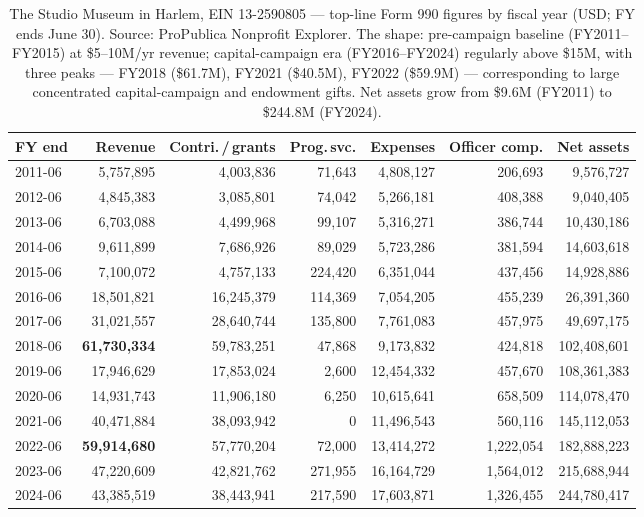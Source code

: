 \documentclass[10pt,letterpaper,twocolumn]{article}
\begin{document}
\begin{table}[t]
\footnotesize
\centering
\setlength{\tabcolsep}{4pt}
\begin{tabularx}{\textwidth}{Xrrrrrr}
\toprule
\textbf{FY end} & \textbf{Revenue} & \textbf{Contri.\,/\,grants} & \textbf{Prog.\,svc.} & \textbf{Expenses} & \textbf{Officer comp.} & \textbf{Net assets} \\
\midrule
2011-06 & 5,757,895 & 4,003,836 & 71,643 & 4,808,127 & 206,693 & 9,576,727 \\
2012-06 & 4,845,383 & 3,085,801 & 74,042 & 5,266,181 & 408,388 & 9,040,405 \\
2013-06 & 6,703,088 & 4,499,968 & 99,107 & 5,316,271 & 386,744 & 10,430,186 \\
2014-06 & 9,611,899 & 7,686,926 & 89,029 & 5,723,286 & 381,594 & 14,603,618 \\
2015-06 & 7,100,072 & 4,757,133 & 224,420 & 6,351,044 & 437,456 & 14,928,886 \\
2016-06 & 18,501,821 & 16,245,379 & 114,369 & 7,054,205 & 455,239 & 26,391,360 \\
2017-06 & 31,021,557 & 28,640,744 & 135,800 & 7,761,083 & 457,975 & 49,697,175 \\
2018-06 & \textbf{61,730,334} & 59,783,251 & 47,868 & 9,173,832 & 424,818 & 102,408,601 \\
2019-06 & 17,946,629 & 17,853,024 & 2,600 & 12,454,332 & 457,670 & 108,361,383 \\
2020-06 & 14,931,743 & 11,906,180 & 6,250 & 10,615,641 & 658,509 & 114,078,470 \\
2021-06 & 40,471,884 & 38,093,942 & 0 & 11,496,543 & 560,116 & 145,112,053 \\
2022-06 & \textbf{59,914,680} & 57,770,204 & 72,000 & 13,414,272 & 1,222,054 & 182,888,223 \\
2023-06 & 47,220,609 & 42,821,762 & 271,955 & 16,164,729 & 1,564,012 & 215,688,944 \\
2024-06 & 43,385,519 & 38,443,941 & 217,590 & 17,603,871 & 1,326,455 & 244,780,417 \\
\bottomrule
\end{tabularx}
\caption{The Studio Museum in Harlem, EIN 13-2590805 --- top-line Form 990 figures by fiscal year (USD; FY ends June 30). Source: ProPublica Nonprofit Explorer. The shape: pre-campaign baseline (FY2011--FY2015) at \$5--10M/yr revenue; capital-campaign era (FY2016--FY2024) regularly above \$15M, with three peaks --- FY2018 (\$61.7M), FY2021 (\$40.5M), FY2022 (\$59.9M) --- corresponding to large concentrated capital-campaign and endowment gifts. Net assets grow from \$9.6M (FY2011) to \$244.8M (FY2024).}
\label{tab:financials}
\end{table}
\end{document}
